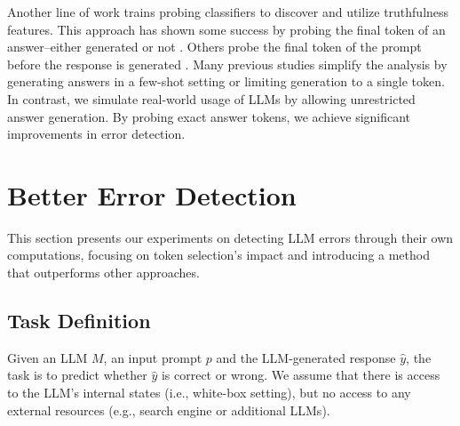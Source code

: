 \documentclass{article} %
\begin{document}
Another line of work trains probing classifiers to discover and utilize truthfulness features.
This approach has shown some success by probing the final token of an answer--either generated \citep{kadavath2022language, snyder2023earlydetectionhallucinationsfactual,yuksekgonul2023attention, zou2023representationengineeringtopdownapproach, yin2024characterizing,chen2024inside,simhi2024constructing,gekhman2025inside} or not \citep{li2024inference, marks2023geometry, burns2022discovering, azaria2023internal, rateike2023weakly}.
Others probe the final token of the prompt before the response is generated \citep{slobodkin-etal-2023-curious, snyder2023earlydetectionhallucinationsfactual,simhi2024constructing,gottesman2024estimating}.
Many previous studies simplify the analysis by generating answers in a few-shot setting or limiting generation to a single token.
In contrast, we simulate real-world usage of LLMs by allowing unrestricted answer generation.
By probing exact answer tokens, we achieve significant improvements in error detection.

\section{Better Error Detection}
\label{sec:detection}

This section presents our experiments on detecting LLM errors through their own computations, focusing on token selection's impact and introducing a method that outperforms other approaches.

\subsection{Task Definition}

Given an LLM $M$, an input prompt $p$ and the LLM-generated response $\hat{y}$, the task is to predict whether $\hat{y}$ is correct or wrong.
We assume that there is access to the LLM's internal states (i.e., white-box setting), but no access to any external resources (e.g., search engine or additional LLMs).
\end{document}
